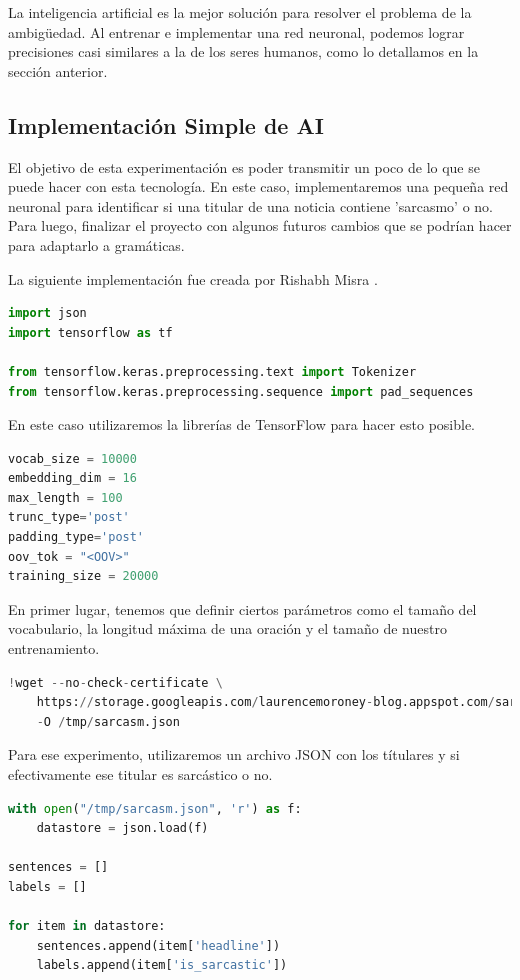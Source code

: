 La inteligencia artificial es la mejor solución para resolver el problema de la ambigüedad. Al entrenar e implementar una red neuronal, podemos lograr precisiones casi similares a la de los seres humanos, como lo detallamos en la sección anterior.

\subsection{Implementación Simple de AI}

El objetivo de esta experimentación es poder transmitir un poco de lo que se puede hacer con esta tecnología. En este caso, implementaremos una pequeña red neuronal para identificar si una titular de una noticia contiene 'sarcasmo' o no. Para luego, finalizar el proyecto con algunos futuros cambios que se podrían hacer para adaptarlo a gramáticas.

La siguiente implementación fue creada por Rishabh Misra \cite{NLPinTensorFlow}.

\begin{lstlisting}[style= mystyle, language=Python]
import json
import tensorflow as tf

from tensorflow.keras.preprocessing.text import Tokenizer
from tensorflow.keras.preprocessing.sequence import pad_sequences
\end{lstlisting}

En este caso utilizaremos la librerías de TensorFlow para hacer esto posible.

\begin{lstlisting}[style= mystyle, language=Python]
vocab_size = 10000
embedding_dim = 16
max_length = 100
trunc_type='post'
padding_type='post'
oov_tok = "<OOV>"
training_size = 20000
\end{lstlisting}

En primer lugar, tenemos que definir ciertos parámetros como el tamaño del vocabulario, la longitud máxima de una oración y el tamaño de nuestro entrenamiento.

\begin{lstlisting}[style= mystyle, language=Python]
!wget --no-check-certificate \
    https://storage.googleapis.com/laurencemoroney-blog.appspot.com/sarcasm.json \
    -O /tmp/sarcasm.json
\end{lstlisting}

Para ese experimento, utilizaremos un archivo JSON con los títulares y si efectivamente ese titular es sarcástico o no. 

\begin{lstlisting}[style= mystyle, language=Python]
with open("/tmp/sarcasm.json", 'r') as f:
    datastore = json.load(f)

sentences = []
labels = []

for item in datastore:
    sentences.append(item['headline'])
    labels.append(item['is_sarcastic'])
\end{lstlisting}


